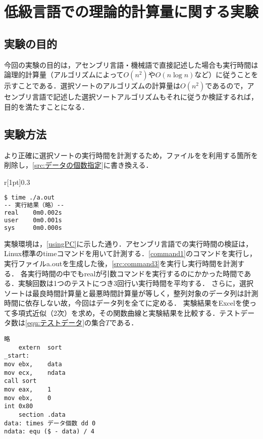 \chapter{低級言語での理論的計算量に関する実験}\label{chap:時間計測}
\section{実験の目的}
今回の実験の目的は，アセンブリ言語・機械語で直接記述した場合も実行時間は論理的計算量（アルゴリズムによって\(O(n^2)\)や\(O(n\log n)\)など）に従うことを示すことである．選択ソートのアルゴリズムの計算量は\(O(n^2)\)である\cite[p.50,51]{アルゴリズムとデータ構造}ので，アセンブリ言語で記述した選択ソートアルゴリズムもそれに従うか検証するれば，目的を満たすことになる．
\section{実験方法}\label{sec:時間計測}
より正確に選択ソートの実行時間を計測するため，\testsort ファイルを\print を利用する箇所を削除し，\ref{src:データの個数指定}に書き換える．\par
\begin{wrapfigure}{r}[1pt]{0.3\textwidth}
    \vspace{-3em}
    \begin{lstlisting}[language={Bash},caption={時間計測実行コマンド},label={src:command3},frame={single},numbers={none}]
$ time ./a.out
-- 実行結果（略）--
real    0m0.002s
user    0m0.001s
sys     0m0.000s
\end{lstlisting}
    \vspace{-3em}
\end{wrapfigure}
実験環境は，\ref{usingPC}に示した通り．アセンブリ言語での実行時間の検証は，Linux標準の{\ttfamily time}コマンドを用いて計測する．\ref{command1}のコマンドを実行し，実行ファイル{\ttfamily a.out}を生成した後，\ref{src:command3}を実行し実行時間を計測する．
各実行時間の中でも{\ttfamily real}が引数コマンドを実行するのにかかった時間である．実験回数は1つのテストにつき3回行い実行時間を平均する．
さらに，選択ソートは最良時間計算量と最悪時間計算量が等しく\cite[p.50]{アルゴリズムとデータ構造}，整列対象のデータ列は計測時間に依存しない故，今回はデータ列を全て{}に定める．
実験結果をExcelを使って多項式近似（2次）を求め，その関数曲線と実験結果を比較する．テストデータ数は\eqref{equ:テストデータ}の集合\(T\)である．\\
\begin{minipage}[c]{0.43\textwidth}
    \centering
    \hspace*{2em}
    \begin{lstlisting}[caption={\testsort 書き換え後}, label={src:データの個数指定},frame={single},numbers={none}]
略
    extern  sort
_start:
mov ebx,    data
mov ecx,    ndata
call sort
mov eax,    1
mov ebx,    0
int 0x80
    section .data
data: times データ個数 dd 0
ndata: equ ($ - data) / 4
    \end{lstlisting}
\end{minipage}
